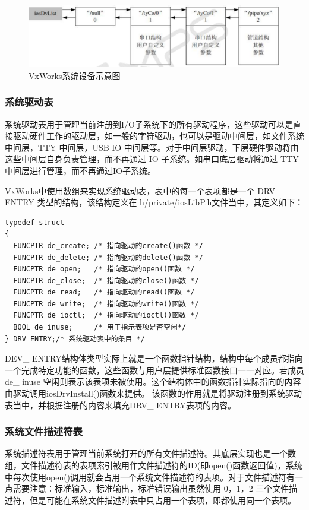 \begin{figure}[!h]
\centering
\includegraphics[width=1.0\textwidth]{./graphics/vxworks-device-link.pdf}
\caption{VxWorks系统设备示意图}\label{fig:VxWorks系统设备示意图}
\end{figure}

\subsubsection{系统驱动表}	
	系统驱动表用于管理当前注册到I/O子系统下的所有驱动程序，这些驱动可以是直接驱动硬件工作的驱动层，如一般的字符驱动，也可以是驱动中间层，如文件系统中间层，TTY 中间层，USB IO 中间层等。对于中间层驱动，下层硬件驱动将由这些中间层自身负责管理，而不再通过 IO 子系统。如串口底层驱动将通过 TTY 中间层进行管理，而不再通过IO子系统\cite{VxWorks内核解读}\cite{罗国庆2003VxWorks}。
	
	VxWorks中使用数组来实现系统驱动表，表中的每一个表项都是一个 DRV\_ ENTRY 类型的结构，该结构定义在 h/private/iosLibP.h文件当中，其定义如下\cite{VxWorks内核解读}：
\lstset{language=C}
\begin{lstlisting}
typedef struct  
{ 
  FUNCPTR de_create; /* 指向驱动的create()函数 */
  FUNCPTR de_delete; /* 指向驱动的delete()函数 */
  FUNCPTR de_open; 	 /* 指向驱动的open()函数 */
  FUNCPTR de_close;  /* 指向驱动的close()函数 */
  FUNCPTR de_read;   /* 指向驱动的read()函数 */
  FUNCPTR de_write;  /* 指向驱动的write()函数 */
  FUNCPTR de_ioctl;  /* 指向驱动的ioctl()函数 */
  BOOL de_inuse;     /* 用于指示表项是否空闲*/
} DRV_ENTRY;/* 系统驱动表中的条目 */ 
\end{lstlisting}
DEV\_ ENTRY结构体类型实际上就是一个函数指针结构，结构中每个成员都指向一个完成特定功能的函数，这些函数与用户层提供标准函数接口一一对应\cite{VxWorks内核解读}\cite{VxWorksDriverAPI}\cite{Wind2003VxWorks}。若成员 de\_ inuse 空闲则表示该表项未被使用。这个结构体中的函数指针实际指向的内容由驱动调用iosDrvInstall()函数来提供。 该函数的作用就是将驱动注册到系统驱动表当中，并根据注册的内容来填充DRV\_ ENTRY表项的内容。


\subsubsection{系统文件描述符表}
	系统描述符表用于管理当前系统打开的所有文件描述符。其底层实现也是一个数组，文件描述符表的表项索引被用作文件描述符的ID(即open()函数返回值)，系统中每次使用open()调用就会占用一个系统文件描述符的表项。对于文件描述符有一点需要注意：标准输入，标准输出，标准错误输出虽然使用 0，1，2 三个文件描述符，但是可能在系统文件描述附表中只占用一个表项，即都使用同一个表项\cite{基于VxWorks的嵌入式实时系统设计}\cite{VxWorks内核解读}\cite{An2003Implementation}。
		
